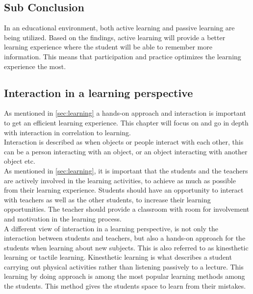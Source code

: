 \subsection*{Sub Conclusion}
In an educational environment, both active learning and passive learning are being utilized. Based on the findings, active learning will provide a better learning experience where the student will be able to remember more information. This means that participation and practice optimizes the learning experience the most.\\

\subsection{Interaction in a learning perspective}\label{sec:interaction} 
As mentioned in \autoref{sec:learning} a hands-on approach and interaction is important to get an efficient learning experience. This chapter will focus on and go in depth with interaction in correlation to learning.\\

Interaction is described as when objects or people interact with each other, this can be a person interacting with an object, or an object interacting with another object etc.\\

As mentioned in \autoref{sec:learning}, it is important that the students and the teachers are actively involved in the learning activities, to achieve as much as possible from their learning experience. Students should have an opportunity to interact with teachers as well as the other students, to increase their learning opportunities. The teacher should provide a classroom with room for involvement and motivation in the learning process\cite{interactionlearning}.\\

A different view of interaction in a learning perspective, is not only the interaction between students and teachers, but also a hands-on approach for the students when learning about new subjects. This is also referred to as kinesthetic learning or tactile learning\cite{kinest}. Kinesthetic learning is what describes a student carrying out physical activities rather than listening passively to a lecture\cite{kinest}. This learning by doing approach is among the most popular learning methods among the students\cite{kinest}. This method gives the students space to learn from their mistakes\cite{kinest}. \\

